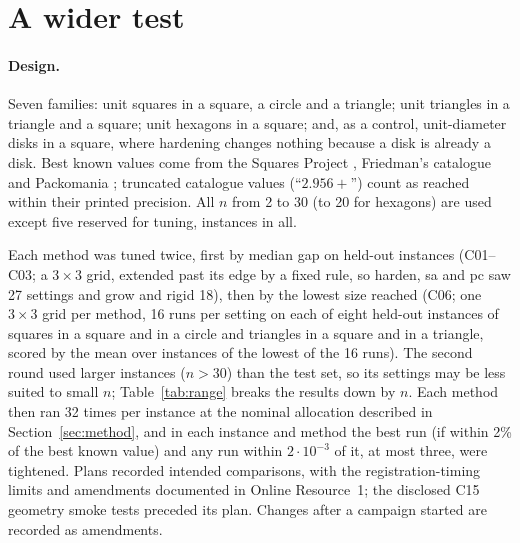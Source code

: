 \section{A wider test}\label{sec:breadth}
\paragraph{Design.} Seven families: unit squares in a square, a circle and a triangle; unit triangles in a triangle and a square; unit hexagons in a square; and, as a control, unit-diameter disks in a square, where hardening changes nothing because a disk is already a disk. Best known values come from the Squares Project \citep{squaresproject}, Friedman's catalogue \citep{friedmancenter} and Packomania \citep{packomania}; truncated catalogue values (``$2.956+$'') count as reached within their printed precision. All $n$ from 2 to 30 (to 20 for hexagons) are used except five reserved for tuning, \CsevenInstances{} instances in all.

Each method was tuned twice, first by median gap on held-out instances (C01--C03; a $3\times3$ grid, extended past its edge by a fixed rule, so harden, sa and pc saw 27 settings and grow and rigid 18), then by the lowest size reached (C06; one $3\times3$ grid per method, 16 runs per setting on each of eight held-out instances of squares in a square and in a circle and triangles in a square and in a triangle, scored by the mean over instances of the lowest of the 16 runs). The second round used larger instances ($n>30$) than the test set, so its settings may be less suited to small $n$; Table~\ref{tab:range} breaks the results down by $n$. Each method then ran 32 times per instance at the nominal allocation described in Section~\ref{sec:method}, and in each instance and method the best run (if within 2\% of the best known value) and any run within $2\cdot10^{-3}$ of it, at most three, were tightened. Plans recorded intended comparisons, with the registration-timing limits and amendments documented in Online Resource~1; the disclosed C15 geometry smoke tests preceded its plan. Changes after a campaign started are recorded as amendments.

